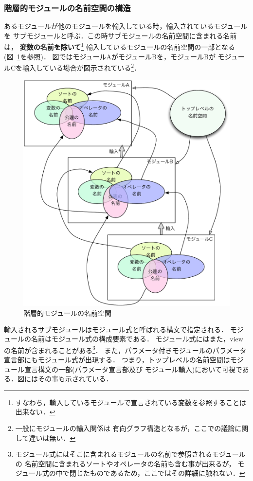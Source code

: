 \documentclass[a4paper,oneside,10pt]{memoir}
\begin{document}
\subsubsection{階層的モジュールの名前空間の構造}
\label{sec:hierachical-module}
あるモジュールが他のモジュールを輸入している時，輸入されているモジュールを%
サブモジュールと呼ぶ．この時サブモジュールの名前空間に含まれる名前は，
\textbf{変数の名前を除いて}\footnote{
すなわち，輸入しているモジュールで宣言されている変数を参照することは出来ない．}
輸入しているモジュールの名前空間の一部となる(図~\ref{fig:hir-module}を参照)．
図ではモジュールAがモジュールBを，モジュールBが%
モジュールCを輸入している場合が図示されている\footnote{一般にモジュールの輸入関係は%
有向グラフ構造となるが，ここでの議論に関して違いは無い．}．
\begin{figure}[!ht]
\begin{center}
  \includegraphics[scale=0.7]{hir-module-namespace.pdf}
  \caption{階層的モジュールの名前空間}
  \label{fig:hir-module}
\end{center}
\end{figure}

輸入されるサブモジュールはモジュール式と呼ばれる構文で指定される．
モジュールの名前はモジュール式の構成要素である．
モジュール式にはまた，viewの名前が含まれることがある\footnote{
モジュール式にはそこに含まれるモジュールの名前で参照されるモジュールの%
名前空間に含まれるソートやオペレータの名前も含む事が出来るが，
モジュール式の中で閉じたものであるため，ここではその詳細に触れない．}．
また，パラメータ付きモジュールのパラメータ宣言部にもモジュール式が出現する．
つまり，トップレベルの名前空間はモジュール宣言構文の一部(パラメータ宣言部及び%
モジュール輸入)において可視である．図にはその事も示されている．
\end{document}
